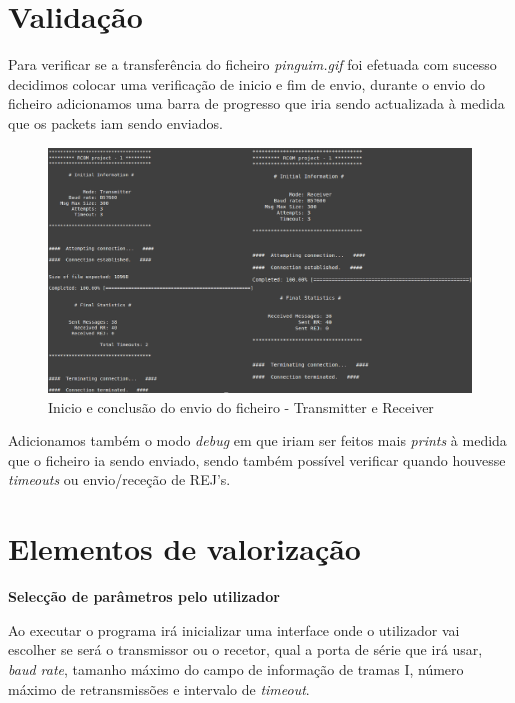 \documentclass[11pt]{article}
\begin{document}
\newpage
\section{Validação}

Para verificar se a transferência do ficheiro \textit{pinguim.gif} foi efetuada com sucesso decidimos colocar uma verificação de inicio e fim de envio,  durante o envio do ficheiro adicionamos uma barra de progresso que iria sendo actualizada à medida que os packets iam sendo enviados. 

\begin{figure}[h!]
\hspace*{-1.2cm}\includegraphics[scale=0.95]{transrec.png}
\caption{Inicio e conclusão do envio do ficheiro - Transmitter e Receiver}
\label{fig:codigoFigura}
\end{figure}

\par Adicionamos também o modo \textit{debug} em que iriam ser feitos mais \textit{prints} à medida que o ficheiro ia sendo enviado, sendo também possível verificar quando houvesse \textit{timeouts} ou envio/receção de REJ's. 






\newpage
\section{ Elementos de valorização}

\textbf{Selecção de parâmetros pelo utilizador}
\par Ao executar o programa irá inicializar uma interface onde o utilizador vai escolher se será o transmissor ou o recetor, qual a porta de série que irá usar, \textit{baud rate}, tamanho máximo do campo de informação de tramas I, número máximo de retransmissões e intervalo de \textit{timeout}.\newline
\end{document}
